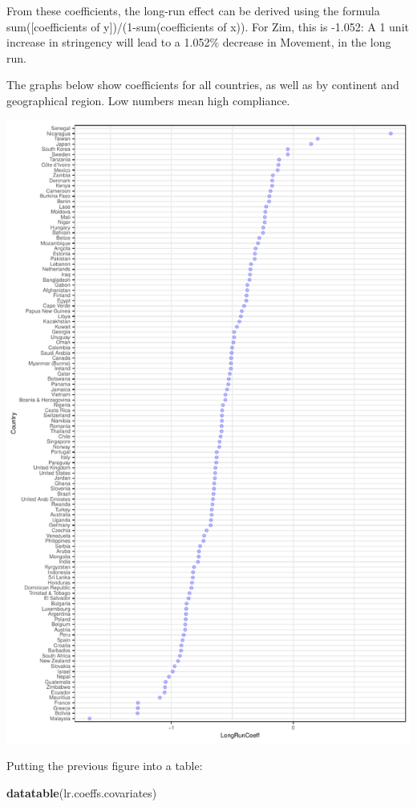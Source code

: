 \documentclass[
  english,
  ,doc,floatsintext]{apa6}
\newenvironment{Shaded}{\begin{snugshade}}{\end{snugshade}}
\newcommand{\KeywordTok}[1]{\textcolor[rgb]{0.13,0.29,0.53}{\textbf{#1}}}
\newcommand{\NormalTok}[1]{#1}
\begin{document}
From these coefficients, the long-run effect can be derived using the formula sum({[}coefficients of y{]})/(1-sum(coefficients of x)). For Zim, this is -1.052: A 1 unit increase in stringency will lead to a 1.052\% decrease in Movement, in the long run.

The graphs below show coefficients for all countries, as well as by continent and geographical region. Low numbers mean high compliance.

\includegraphics{LR_explore_OK_comms_files/figure-latex/coeff graphs-1.pdf}

Putting the previous figure into a table:

\begin{Shaded}
\begin{Highlighting}[]
\KeywordTok{datatable}\NormalTok{(lr.coeffs.covariates)}
\end{Highlighting}
\end{Shaded}
\end{document}
